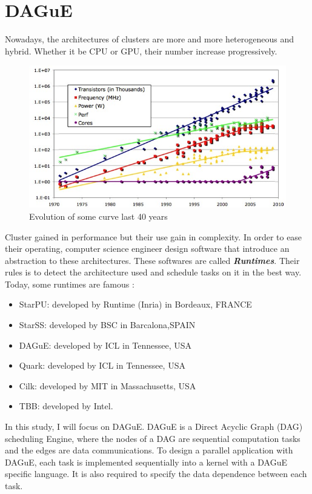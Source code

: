 \documentclass{report}
\begin{document}
\chapter{DAGuE}

Nowadays, the architectures of clusters are more and more heterogeneous and hybrid. Whether it be CPU or GPU, their number increase progressively.
\begin{figure}[!ht]
\begin{center}
\includegraphics[width=\textwidth]{increase.png} 
\end{center}
\caption{Evolution of some curve last 40 years}
\end{figure}
Cluster gained in performance but their use gain in complexity. In order to ease their operating, computer science engineer design software that introduce an abstraction to these architectures. These softwares are called \textbf{\textit{Runtimes}}. Their rules is to detect the architecture used and schedule tasks on it in the best way. Today, some runtimes are famous :
\begin{itemize}
\item StarPU: developed by Runtime (Inria) in Bordeaux, FRANCE
\item StarSS: developed by BSC in Barcalona,SPAIN
\item DAGuE: developed by ICL in Tennessee, USA
\item Quark: developed by ICL in Tennessee, USA
\item Cilk: developed by MIT in Massachusetts, USA
\item TBB: developed by Intel.
\end{itemize}
In this study, I will focus on DAGuE. DAGuE is a Direct Acyclic Graph (DAG) scheduling Engine, where the nodes of a DAG are sequential computation tasks and the edges are data communications. To design a parallel application with DAGuE, each task is implemented sequentially into a kernel with a DAGuE specific language. It is also required to specify the data dependence between each task.
\end{document}
